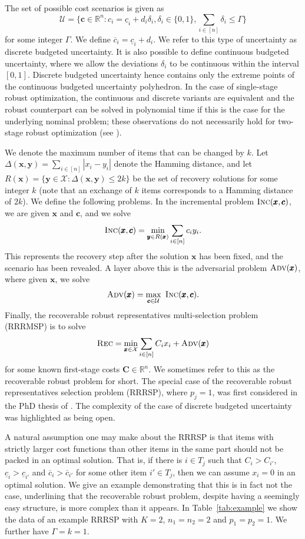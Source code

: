 \documentclass[a4paper,11pt,abstracton]{scrartcl}
\theoremstyle{definition}
\theoremstyle{remark}
\newcommand{\rr}{\mathbb{R}}
\newcommand{\X}{\mathcal{X}}
\newcommand{\cU}{\mathcal{U}}
\begin{document}
The set of possible cost scenarios is given as
\[ \cU = \{ \pmb{c}\in\mathbb{R}^n : c_i = \underline{c}_i + d_i \delta_i, \delta_i\in\{0,1\}, \sum_{i\in[n]} \delta_i \le \Gamma \} \]
for some integer $\Gamma$. We define $\overline{c}_i = \underline{c}_i + d_i$.
We refer to this type of uncertainty as discrete budgeted uncertainty. It is also possible to define continuous budgeted uncertainty, where we allow the deviations $\delta_i$ to be continuous within the interval $[0,1]$. Discrete budgeted uncertainty hence contains only the extreme points of the continuous budgeted uncertainty polyhedron. In the case of single-stage robust optimization, the continuous and discrete variants are equivalent and the robust counterpart can be solved in polynomial time if this is the case for the underlying nominal problem; these observations do not necessarily hold for two-stage robust optimization (see \cite{chassein2018recoverable}).

We denote the maximum number of items that can be changed by $k$.
Let $\Delta(\pmb{x},\pmb{y}) = \sum_{i\in[n]} |x_i-y_i|$ denote the Hamming distance, and let $R(\pmb{x}) = \{ \pmb{y}\in\X : \Delta(\pmb{x},\pmb{y})\le 2k\}$ be the set of recovery solutions for some integer $k$ (note that an exchange of $k$ items corresponds to a Hamming distance of $2k$).
We define the following problems. In the incremental problem $\textsc{Inc}(\pmb{x},\pmb{c})$, we are given $\pmb{x}$ and $\pmb{c}$, and we solve
\[ \textsc{Inc}(\pmb{x},\pmb{c}) = \min_{\pmb{y}\in R(\pmb{x})} \sum_{i\in[n]} c_i y_i. \]
This represents the recovery step after the solution $\pmb{x}$ has been fixed, and the scenario has been revealed. A layer above this is the adversarial problem {$\textsc{Adv}(\pmb{x})$}, where given $\pmb{x}$, we solve
\[ \textsc{Adv}(\pmb{x}) = \max_{\pmb{c}\in\cU}\ \textsc{Inc}(\pmb{x},\pmb{c}). \]
Finally, the recoverable robust representatives multi-selection problem (RRRMSP) is to solve
\[ \textsc{Rec} = \min_{\pmb{x}\in\X} \sum_{i\in[n]} C_ix_i + \textsc{Adv}(\pmb{x}) \]
for some known first-stage costs $\pmb{C}\in\rr^n$.
We sometimes refer to this as the recoverable robust problem for short. The special case of the recoverable robust representatives selection problem (RRRSP), where $p_j=1$,  was first considered in the PhD thesis of \cite{busing2011phd}. The complexity of the case of discrete budgeted uncertainty was highlighted as being open.


A natural assumption one may make about the RRRSP is that items with strictly larger cost functions than other items in the same part should not be packed in an optimal solution. That is, if there is $i\in T_j$ such that $C_i > C_{i'}$, $\underline{c}_i > \underline{c}_{i'}$ and $\overline{c}_i > \overline{c}_{i'}$ for some other item $i'\in T_j$, then we can assume $x_i=0$ in an optimal solution. We give an example demonstrating that this is in fact not the case, underlining that the recoverable robust problem, despite having a seemingly easy structure, is more complex than it appears.
In Table~\ref{tab:example} we show the data of an example RRRSP with $K=2$, $n_1 = n_2 = 2$ and $p_1 = p_2 = 1$. We further have $\Gamma=k=1$. 
\end{document}
